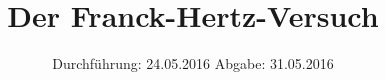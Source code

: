 

\subject{Versuch Nummer 601}
\title{Der Franck-Hertz-Versuch}
\date{
  Durchführung: 24.05.2016
  \hspace{3em}
  Abgabe: 31.05.2016
}



\maketitle
\thispagestyle{empty}
\tableofcontents
\newpage






\printbibliography


